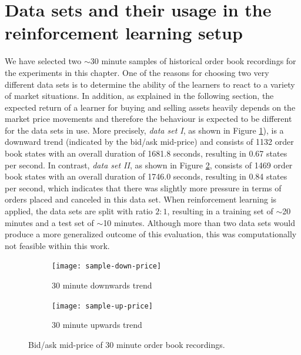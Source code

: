 \section{Data sets and their usage in the reinforcement learning setup}
\label{sec:analysis-data-sets}
We have selected two $\sim$30 minute samples of historical order book recordings for the experiments in this chapter.
One of the reasons for choosing two very different data sets is to determine the ability of the learners to react to a variety of market situations.
In addition, as explained in the following section, the expected return of a learner for buying and selling assets heavily depends on the market price movements and therefore the behaviour is expected to be different for the data sets in use.
More precisely, \textit{data set I}, as shown in Figure \ref{fig:sample-down-price}), is a downward trend (indicated by the bid/ask mid-price) and consists of 1132 order book states with an overall duration of 1681.8 seconds, resulting in 0.67 states per second.
In contrast, \textit{data set II}, as shown in Figure \ref{fig:sample-up-price}, consists of 1469 order book states with an overall duration of 1746.0 seconds, resulting in 0.84 states per second, which indicates that there was slightly more pressure in terms of orders placed and canceled in this data set.
When reinforcement learning is applied, the data sets are split with ratio $2:1$, resulting in a training set of $\sim$20 minutes and a test set of $\sim$10 minutes.
Although more than two data sets would produce a more generalized outcome of this evaluation, this was computationally not feasible within this work.
\begin{figure}[H]
    \centering
    \begin{subfigure}[b]{0.45\textwidth}
        \texttt{[image: sample-down-price]}
        \caption{30 minute downwards trend}
        \label{fig:sample-down-price}
    \end{subfigure}
    \begin{subfigure}[b]{0.45\textwidth}
        \texttt{[image: sample-up-price]}
        \caption{30 minute upwards trend}
        \label{fig:sample-up-price}
    \end{subfigure}
    \caption{Bid/ask mid-price of 30 minute order book recordings.}
    \label{fig:sample-price}
\end{figure}

